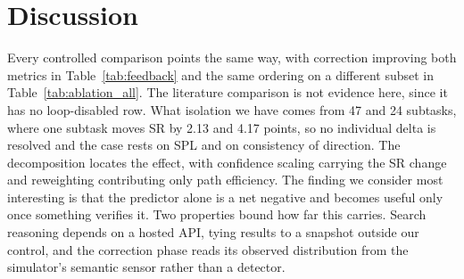 \section{Discussion}
\label{sec:discussion}


Every controlled comparison points the same way, with correction improving both metrics in Table~\ref{tab:feedback} and the same ordering on a different subset in Table~\ref{tab:ablation_all}. The literature comparison is not evidence here, since it has no loop-disabled row. What isolation we have comes from 47 and 24 subtasks, where one subtask moves SR by 2.13 and 4.17 points, so no individual delta is resolved and the case rests on SPL and on consistency of direction. The decomposition locates the effect, with confidence scaling carrying the SR change and reweighting contributing only path efficiency. The finding we consider most interesting is that the predictor alone is a net negative and becomes useful only once something verifies it. Two properties bound how far this carries. Search reasoning depends on a hosted API, tying results to a snapshot outside our control, and the correction phase reads its observed distribution from the simulator's semantic sensor rather than a detector.
